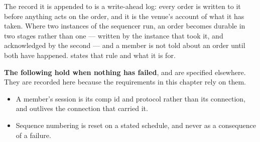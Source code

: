 The record it is appended to is a write-ahead log: every order is written to it
before anything acts on the order, and it is the venue's account of what it has
taken. Where two instances of the sequencer run, an order becomes durable in two
stages rather than one --- written by the instance that took it, and acknowledged
by the second --- and a member is not told about an order until both have
happened.  states that rule and what it
is for.

\textbf{The following hold when nothing has failed}, and are specified
elsewhere. They are recorded here because the requirements in this chapter rely
on them.

\begin{itemize}[nosep]
  \item A member's session is its comp id and protocol rather than its
        connection, and outlives the connection that carried it.
  \item Sequence numbering is reset on a stated schedule, and never as a
        consequence of a failure.
\end{itemize}





